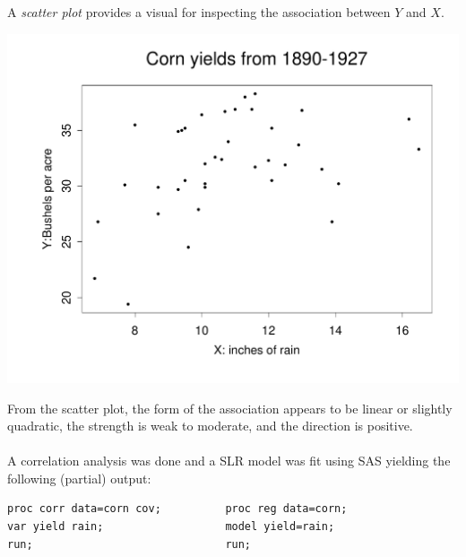 \documentclass{report}
\begin{document}
A {\em scatter plot} provides a visual for inspecting the association between $Y$ and $X$.  
\begin{center}
\includegraphics[scale=0.3]{cornyield.pdf}
\end{center}
From the scatter plot, the form of the association appears to be linear or slightly quadratic, the strength is weak to moderate, and the direction is positive.\\~\\

A correlation analysis was done and a SLR model was fit using SAS yielding the following (partial) output:
\begin{small}
\begin{verbatim}
proc corr data=corn cov;          proc reg data=corn;
var yield rain;                   model yield=rain;
run;                              run;
\end{verbatim}
\end{small}
\end{document}
